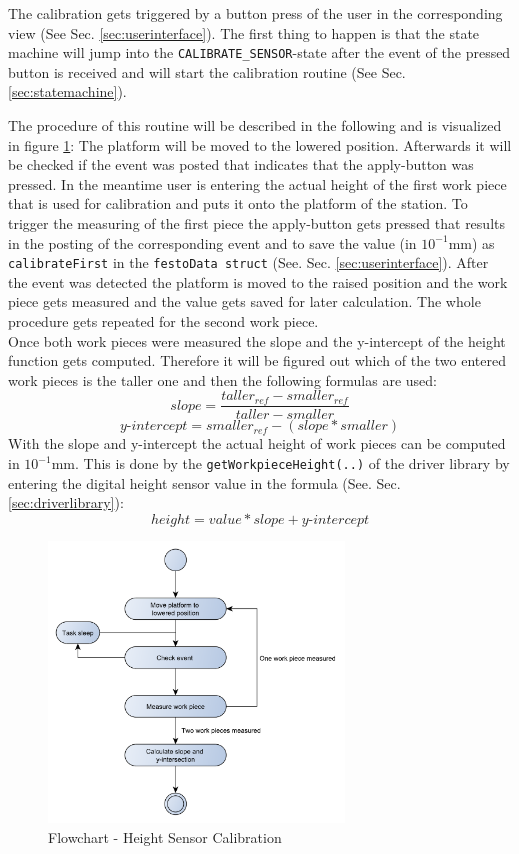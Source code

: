 The calibration gets triggered by a button press of the user in the corresponding view (See Sec. \ref{sec:userinterface}). The first thing to happen is that the state machine will jump into the \texttt{CALIBRATE\_SENSOR}-state after the event of the pressed button is received and will start the calibration routine (See Sec. \ref{sec:statemachine}). 

The procedure of this routine will be described in the following and is visualized in figure \ref{fig:calibration}: 
The platform will be moved to the lowered position. Afterwards it will be checked if the event was posted that indicates that the apply-button was pressed. In the meantime user is entering the actual height of the first work piece that is used for calibration and puts it onto the platform of the station. To trigger the measuring of the first piece the apply-button gets pressed that results in the posting of the corresponding event and to save the value (in $10^{-1}$mm) as \texttt{calibrateFirst} in the \texttt{festoData struct} (See. Sec. \ref{sec:userinterface}). 
After the event was detected the platform is moved to the raised position and the work piece gets measured and the value gets saved for later calculation.
The whole procedure gets repeated for the second work piece. \\
Once both work pieces were measured the slope and the y-intercept of the height function gets computed. Therefore it will be figured out which of the two entered work pieces is the taller one and then the following formulas are used:
\[slope = \frac{taller_{ref} - smaller_{ref}}{taller - smaller}\]
\[y\text{-}intercept = smaller_{ref} - (slope * smaller)\]
With the slope and y-intercept the actual height of work pieces can be computed in $10^{-1}$mm. This is done by the \texttt{getWorkpieceHeight(..)} of the driver library by entering the digital height sensor value in the formula (See. Sec. \ref{sec:driverlibrary}):
\[height = value * slope + y\text{-}intercept\]

\begin{figure}[H]
	\begin{center}
		\includegraphics[width=0.7\textwidth]{media/Flow_Chart_Calibration.pdf} 	
		\caption{Flowchart - Height Sensor Calibration}
		\label{fig:calibration}
	\end{center}
\end{figure}

